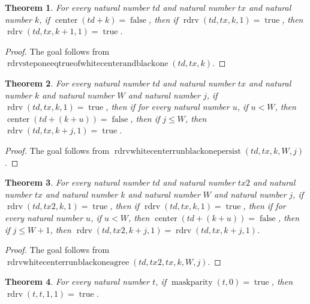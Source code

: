 \documentclass[11pt]{article}
\newtheorem{theorem}{Theorem}[section]
\theoremstyle{definition}
\begin{document}
\begin{theorem}
\label{ll:paper:rdrv-step-one-eq-true-of-white-center-and-black-one}
For every natural number \(td\) and natural number \(tx\) and natural number \(k\), if \(\operatorname{center}(td + k) = \operatorname{false}\), then if \(\operatorname{rdrv}(td, tx, k, 1) = \operatorname{true}\), then \(\operatorname{rdrv}(td, tx, k + 1, 1) = \operatorname{true}\).
\end{theorem}
\begin{proof}
The goal follows from \(\operatorname{rdrvsteponeeqtrueofwhitecenterandblackone}(td, tx, k)\).
\end{proof}
\begin{theorem}
\label{ll:paper:rdrv-white-center-run-black-one-persist}
For every natural number \(td\) and natural number \(tx\) and natural number \(k\) and natural number \(W\) and natural number \(j\), if \(\operatorname{rdrv}(td, tx, k, 1) = \operatorname{true}\), then if for every natural number \(u\), if \(u < W\), then \(\operatorname{center}(td + (k + u)) = \operatorname{false}\), then if \(j \le W\), then \(\operatorname{rdrv}(td, tx, k + j, 1) = \operatorname{true}\).
\end{theorem}
\begin{proof}
The goal follows from \(\operatorname{rdrvwhitecenterrunblackonepersist}(td, tx, k, W, j)\).
\end{proof}
\begin{theorem}
\label{ll:paper:rdrv-white-center-run-black-one-agree}
For every natural number \(td\) and natural number \(tx2\) and natural number \(tx\) and natural number \(k\) and natural number \(W\) and natural number \(j\), if \(\operatorname{rdrv}(td, tx2, k, 1) = \operatorname{true}\), then if \(\operatorname{rdrv}(td, tx, k, 1) = \operatorname{true}\), then if for every natural number \(u\), if \(u < W\), then \(\operatorname{center}(td + (k + u)) = \operatorname{false}\), then if \(j \le W + 1\), then \(\operatorname{rdrv}(td, tx2, k + j, 1) = \operatorname{rdrv}(td, tx, k + j, 1)\).
\end{theorem}
\begin{proof}
The goal follows from \(\operatorname{rdrvwhitecenterrunblackoneagree}(td, tx2, tx, k, W, j)\).
\end{proof}
\begin{theorem}
\label{ll:paper:rdrv-step-one-eq-true-of-maskparity-zero-true}
For every natural number \(t\), if \(\operatorname{maskparity}(t, 0) = \operatorname{true}\), then \(\operatorname{rdrv}(t, t, 1, 1) = \operatorname{true}\).
\end{theorem}
\end{document}
